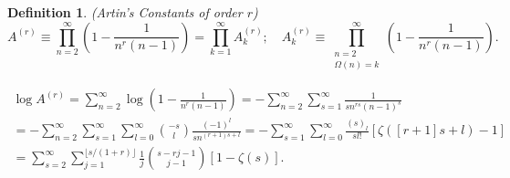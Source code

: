 \documentclass{amsart}
\newtheorem{defn}{Definition}
\begin{document}
\begin{defn}
(Artin's Constants of order $r$) \cite{WrenchMCom15}
\begin{equation}
A^{(r)}\equiv \prod_{n=2}^\infty \left(1-\frac{1}{n^r(n-1)} \right)
=\prod_{k=1}^\infty A_k^{(r)};\quad 
A_k^{(r)}\equiv \prod_{\substack{n=2\\ \Omega(n)=k}}^\infty 
\left(1-\frac{1}{n^r(n-1)} \right)
\label{eq.ArtDef}
.
\end{equation}
\end{defn}
\begin{gather}
\log A^{(r)}
=
\sum_{n=2}^\infty \log \left(1-\frac{1}{n^r(n-1)}\right)
=
- \sum_{n=2}^\infty \sum_{s=1}^\infty \frac{1}{s n^{rs}(n-1)^s}
\label{eq.Ar}
\\
=
- \sum_{n=2}^\infty \sum_{s=1}^\infty \sum_{l=0}^\infty \binom{-s}{l}\frac{(-1)^l}{s n^{(r+1)s+l}}
=
- \sum_{s=1}^\infty \sum_{l=0}^\infty \frac{(s)_l}{sl!}\left[\zeta([r+1]s+l)-1\right]
\nonumber
\\
=
\sum_{s=2}^\infty \sum_{j=1}^{\lfloor s/(1+r)\rfloor} \frac{1}{j}\binom{s-rj-1}{j-1}[1-\zeta(s)]
.
\nonumber
\end{gather}
\end{document}
